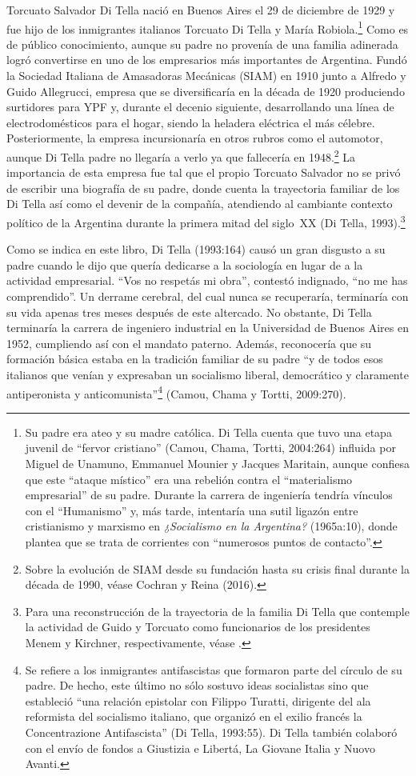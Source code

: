Torcuato Salvador Di Tella nació en Buenos Aires el 29 de diciembre de 1929 y fue hijo de los inmigrantes italianos Torcuato Di Tella y María Robiola.\footnote{Su padre era ateo y su madre católica. Di Tella cuenta que tuvo una etapa juvenil de ``fervor cristiano'' (Camou, Chama, Tortti, 2004:264) influida por Miguel de Unamuno, Emmanuel Mounier y Jacques Maritain, aunque confiesa que este ``ataque místico'' era una rebelión contra el ``materialismo empresarial'' de su padre. Durante la carrera de ingeniería tendría vínculos con el ``Humanismo'' y, más tarde, intentaría una sutil ligazón entre cristianismo y marxismo en \emph{¿Socialismo en la Argentina?} (1965a:10), donde plantea que se trata de corrientes con ``numerosos puntos de contacto''.} Como es de público conocimiento, aunque su padre no provenía de una familia adinerada logró convertirse en uno de los empresarios más importantes de Argentina. Fundó la Sociedad Italiana de Amasadoras Mecánicas (SIAM) en 1910 junto a Alfredo y Guido Allegrucci, empresa que se diversificaría en la década de 1920 produciendo surtidores para YPF y, durante el decenio siguiente, desarrollando una línea de electrodomésticos para el hogar, siendo la heladera eléctrica el más célebre. Posteriormente, la empresa incursionaría en otros rubros como el automotor, aunque Di Tella padre no llegaría a verlo ya que fallecería en 1948.\footnote{Sobre la evolución de SIAM desde su fundación hasta su crisis final durante la década de 1990, véase Cochran y Reina (2016).} La importancia de esta empresa fue tal que el propio Torcuato Salvador no se privó de escribir una biografía de su padre, donde cuenta la trayectoria familiar de los Di Tella así como el devenir de la compañía, atendiendo al cambiante contexto político de la Argentina durante la primera mitad del siglo~XX (Di Tella, 1993).\footnote{Para una reconstrucción de la trayectoria de la familia Di Tella que contemple la actividad de Guido y Torcuato como funcionarios de los presidentes Menem y Kirchner, respectivamente, véase \textcite{1448-CASSESE2008}.}

Como se indica en este libro, Di Tella (1993:164) causó un gran disgusto a su padre cuando le dijo que quería dedicarse a la sociología en lugar de a la actividad empresarial. ``Vos no respetás mi obra'', contestó indignado, ``no me has comprendido''. Un derrame cerebral, del cual nunca se recuperaría, terminaría con su vida apenas tres meses después de este altercado. No obstante, Di Tella terminaría la carrera de ingeniero industrial en la Universidad de Buenos Aires en 1952, cumpliendo así con el mandato paterno. Además, reconocería que su formación básica estaba en la tradición familiar de su padre ``y de todos esos italianos que venían y expresaban un socialismo liberal, democrático y claramente antiperonista y anticomunista''\footnote{Se refiere a los inmigrantes antifascistas que formaron parte del círculo de su padre. De hecho, este último no sólo sostuvo ideas socialistas sino que estableció ``una relación epistolar con Filippo Turatti, dirigente del ala reformista del socialismo italiano, que organizó en el exilio francés la Concentrazione Antifascista'' (Di Tella, 1993:55). Di Tella también colaboró con el envío de fondos a Giustizia e Libertá, La Giovane Italia y Nuovo Avanti.} (Camou, Chama y Tortti, 2009:270).


